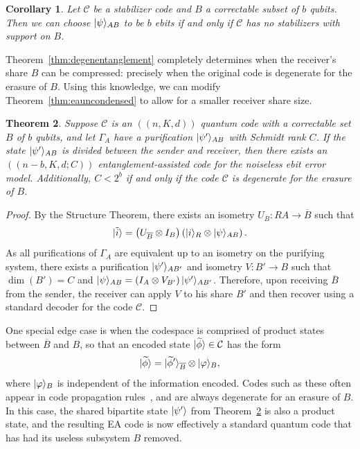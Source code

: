 \documentclass[]{amsart}
\DeclarePairedDelimiter\ket{\lvert}{\rangle}
\newtheorem{theorem}{Theorem}
\newtheorem{corollary}[theorem]{Corollary}
\begin{document}
\begin{corollary}
    Let $\mathcal{C}$ be a stabilizer code and $B$ a correctable subset of $b$ qubits. Then we can choose $\ket{\psi}_{AB}$ to be $b$ ebits if and only if $\mathcal{C}$ has no stabilizers with support on $B$.
\end{corollary}

Theorem~\ref{thm:degenentanglement} completely determines when the receiver's share $B$ can be compressed: precisely when the original code is degenerate for the erasure of $B$.
Using this knowledge, we can modify Theorem~\ref{thm:eauncondensed} to allow for a smaller receiver share size.

\begin{theorem}\label{thm:eacondensed}
    Suppose $\mathcal{C}$ is an $\left(\!\left(n,K,d\right)\!\right)$ quantum code with a correctable set $B$ of $b$ qubits, and let $\Gamma_A$ have a purification $\ket{\psi'}_{AB}$ with Schmidt rank $C$.
    If the state $\ket{\psi'}_{AB}$ is divided between the sender and receiver, then there exists an $\left(\!\left(n-b,K,d;C\right)\!\right)$ entanglement-assisted code for the noiseless ebit error model.
    Additionally, $C<2^b$ if and only if the code $\mathcal{C}$ is degenerate for the erasure of $B$.
\end{theorem}
\begin{proof}
    By the Structure Theorem, there exists an isometry $U_{\overline{B}}: RA\rightarrow \overline{B}$ such that
    \begin{equation}
        \ket{\tilde{i}}=\left(U_{\overline{B}}\otimes I_B\right)\left(\ket{i}_R \otimes \ket{\psi}_{AB}\right).
    \end{equation}
    As all purifications of $\Gamma_A$ are equivalent up to an isometry on the purifying system, there exists a purification $\ket{\psi'}_{AB'}$ and isometry $V:B'\rightarrow B$ such that $\dim\!\left(B'\right)=C$ and $\ket{\psi}_{AB}=\left(I_A\otimes V_{B'}\right)\ket{\psi'}_{AB'}$.
    Therefore, upon receiving $\overline{B}$ from the sender, the receiver can apply $V$ to his share $B'$ and then recover using a standard decoder for the code $\mathcal{C}$.
\end{proof}

One special edge case is when the codespace is comprised of product states between $\overline{B}$ and $B$, so that an encoded state $\ket{\widetilde{\phi}}\in\mathcal{C}$ has the form
\begin{equation}
    \ket{\widetilde{\phi}}=\ket{\widetilde{\phi}'}_{\overline{B}}\otimes\ket{\varphi}_B,
\end{equation}
where $\ket{\varphi}_B$ is independent of the information encoded.
Codes such as these often appear in code propagation rules~\cite[Theorem 6]{CRSS1998}, and are always degenerate for an erasure of $B$.
In this case, the shared bipartite state $\ket{\psi'}$ from Theorem~\ref{thm:eacondensed} is also a product state, and the resulting EA code is now effectively a standard quantum code that has had its useless subsystem $B$ removed.
\end{document}
